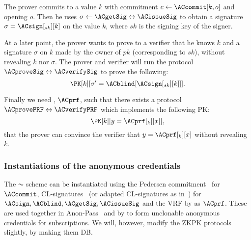 The prover commits to a value \(k\) with commitment \(c\gets \ACcommit[k, o]\) 
and opening \(o\).
Then he uses \(\sigma\gets \ACgetSig\leftrightarrow \ACissueSig\) to obtain a 
signature \(\sigma = \ACsign[_{sk}][k]\) on the value \(k\), where \(sk\) is the 
signing key of the signer.

At a later point, the prover wants to prove to a verifier that he knows \(k\) 
and a signature \(\sigma\) on \(k\) made by the owner of \(pk\) (corresponding 
to \(sk\)), \ie without revealing \(k\) nor \(\sigma\).
The prover and verifier will run the protocol \(\ACproveSig\leftrightarrow 
  \ACverifySig\) to prove the following:
\begin{equation*}
  \PK[k][\sigma' = \ACblind[\ACsign[_{sk}][k]]].
\end{equation*}


Finally we need , \(\ACprf\), such that there exists a protocol 
\(\ACprovePRF\leftrightarrow \ACverifyPRF\) which implements the following 
\ac{PK}:
\begin{equation*}
  \PK[k][y = \ACprf[_k][x]],
\end{equation*}
\ie that the prover can convince the verifier that \(y = \ACprf[_k][x]\) without 
revealing \(k\).


\subsubsection{Instantiations of the anonymous credentials} 

The \(\AC\) scheme can be instantiated using the Pedersen 
commitment~\cite{PedersenCommitment} for \(\ACcommit\),
CL-signatures~\cite{CLsignatures} (or adapted CL-signatures as 
in~\cite{AnonPass}) for \(\ACsign, \ACblind, \ACgetSig, \ACissueSig\) and
the \ac{VRF} by \citet{DY-VRF} as \(\ACprf\).
These are used together in \eg Anon-Pass~\cite{AnonPass} and by 
\citet{HowToWinTheCloneWars} to form unclonable anonymous credentials for 
subscriptions.
We will, however, modify the \ac{ZKPK} protocols slightly, by making them 
\acl{DB}.
